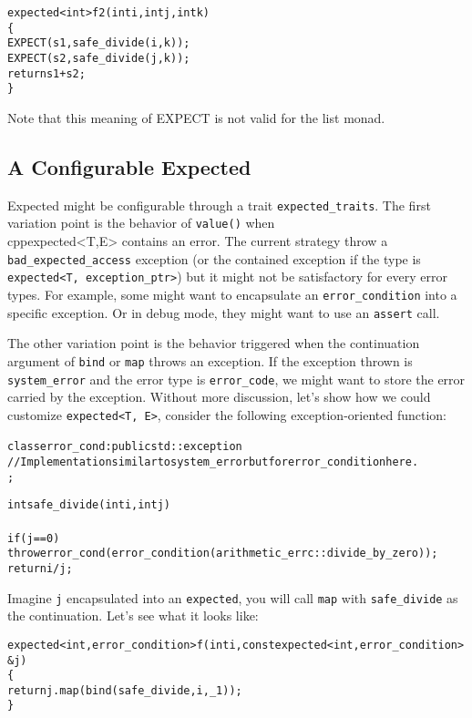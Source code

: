 \documentclass[a4paper,10pt]{article}
\newcommand{\cpp}[1]{\lstinline{#1}}
\begin{document}
\begin{alltt}
expected<int> f2(int i, int j, int k)
\{
  EXPECT(s1, safe_divide(i, k));
  EXPECT(s2, safe_divide(j, k));
  return s1 + s2;
\}
\end{alltt}

Note that this meaning of EXPECT is not valid for the list monad. 

\subsection{A Configurable Expected}
\label{configurable-expected}

Expected might be configurable through a trait \cpp{expected_traits}. The first variation point is the behavior of \cpp{value()} when \\cpp{expected<T,E>} contains an error. The current strategy throw a \cpp{bad_expected_access} exception (or the contained exception if the type is \cpp{expected<T, exception_ptr>}) but it might not be satisfactory for every error types. For example, some might want to encapsulate an \cpp{error_condition} into a specific exception. Or in debug mode, they might want to use an \cpp{assert} call.

The other variation point is the behavior triggered when the continuation argument of \cpp{bind} or \cpp{map} throws an exception. If the exception thrown is \cpp{system_error} and the error type is \cpp{error_code}, we might want to store the error carried by the exception. Without more discussion, let's show how we could customize \cpp{expected<T, E>}, consider the following exception-oriented function:

\begin{alltt}
class error_cond : public std::exception {
  // Implementation similar to system_error but for error_condition here.
};

int safe_divide(int i, int j)
{
  if (j == 0) 
    throw error_cond(error_condition(arithmetic_errc::divide_by_zero));
  return i/j;
}
\end{alltt}

\noindent
Imagine \cpp{j} encapsulated into an \cpp{expected}, you will call \cpp{map} with \cpp{safe_divide} as the continuation. Let's see what it looks like:

\begin{alltt}
expected<int, error_condition> f(int i, const expected<int, error_condition>& j)
\{
  return j.map(bind(safe_divide, i, _1));
\}
\end{alltt}
\end{document}
